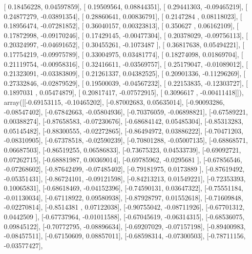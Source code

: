 \documentclass{article}
\begin{document}
       [ 0.18456228,  0.04597859],
       [ 0.19509564,  0.08844351],
       [ 0.29441303, -0.09465219],
       [ 0.24877279, -0.03891354],
       [ 0.28860641,  0.00836791],
       [ 0.2147284 ,  0.08118023],
       [ 0.18956474, -0.07281852],
       [ 0.36040157,  0.00323813],
       [ 0.350627  ,  0.06162109],
       [ 0.17872998, -0.09170246],
       [ 0.17429145, -0.00477304],
       [ 0.20378029, -0.09756113],
       [ 0.20324997, -0.04691652],
       [ 0.30455261, -0.1073487 ],
       [ 0.36817638,  0.05494221],
       [ 0.17754219, -0.09975789],
       [ 0.33004975,  0.03481774],
       [ 0.18274098,  0.01869704],
       [ 0.21119754, -0.00958316],
       [ 0.32416611, -0.03569757],
       [ 0.25179047, -0.01089012],
       [ 0.21323091, -0.03383809],
       [ 0.21261337,  0.04382525],
       [ 0.20901336, -0.11296269],
       [ 0.27332846, -0.02879529],
       [ 0.19500039, -0.04567232],
       [ 0.22153835, -0.12303727],
       [ 0.1897031 ,  0.05474879],
       [ 0.20817417, -0.07572915],
       [ 0.3096617 , -0.00411418]]), array([[-0.69153115, -0.10465202],
       [-0.87002683,  0.05635014],
       [-0.90093286, -0.08547402],
       [-0.67842663, -0.05804936],
       [-0.70376059, -0.06898821],
       [-0.67589221,  0.00388274],
       [-0.87658583, -0.07230676],
       [-0.68684142,  0.05485304],
       [-0.85313283,  0.05145482],
       [-0.88300555, -0.02272865],
       [-0.86494972,  0.03886222],
       [-0.70471203, -0.08310905],
       [-0.67378518, -0.02590239],
       [-0.70801288, -0.05007135],
       [-0.68868571,  0.06687503],
       [-0.86519255,  0.06586833],
       [-0.73675323,  0.04533739],
       [-0.69092721,  0.07262715],
       [-0.68881987,  0.00369014],
       [-0.69785962, -0.0295681 ],
       [-0.67856546, -0.07268602],
       [-0.87642499, -0.07485402],
       [-0.79181975,  0.0173889 ],
       [-0.87619492, -0.05351431],
       [-0.86724101, -0.09121598],
       [-0.84213213,  0.01549221],
       [-0.72353393,  0.10065831],
       [-0.68618469, -0.04152396],
       [-0.74590131,  0.03647322],
       [-0.75551184, -0.01130034],
       [-0.67118922,  0.09580938],
       [-0.87928797,  0.01552618],
       [-0.71609848, -0.02270814],
       [-0.8514381 ,  0.07122038],
       [-0.90755042, -0.08711926],
       [-0.67701312,  0.0442509 ],
       [-0.67737964, -0.01011588],
       [-0.67045619, -0.06314315],
       [-0.68536075,  0.09845122],
       [-0.70772795, -0.08896634],
       [-0.69207029, -0.07157198],
       [-0.89400983, -0.08457511],
       [-0.67150609,  0.08857011],
       [-0.68598314, -0.07300503],
       [-0.78711156, -0.03577427],
\end{document}
